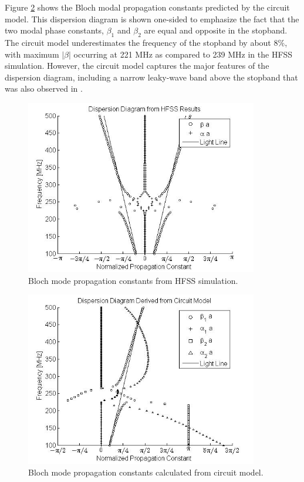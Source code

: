 \documentclass{allertonproc}
\begin{document}
Figure \ref{ckt_dispersion} shows the Bloch modal propagation constants predicted by the circuit model.  This dispersion diagram is shown one-sided to emphasize the fact that the two modal phase constants, $\beta_1$ and $\beta_2$ are equal and opposite in the stopband. The circuit model underestimates the frequency of the stopband by about 8\%, with maximum $|\beta|$ occurring at 221 MHz as compared to 239 MHz in the HFSS simulation.  However, the circuit model captures the major features of the dispersion diagram, including a narrow leaky-wave band above the stopband that was also observed in \cite{besthanna}.
\begin{figure}[htbp]
\begin{center}
\includegraphics[width=4in]{HFSS_dispersion}
\caption{Bloch mode propagation constants from HFSS simulation.}
\label{HFSS_dispersion}
\end{center}
\end{figure}
\begin{figure}[htbp]
\begin{center}
\includegraphics[width=4in]{ckt_dispersion}
\caption{Bloch mode propagation constants calculated from circuit model.}
\label{ckt_dispersion}
\end{center}
\end{figure}
\FloatBarrier
\end{document}
